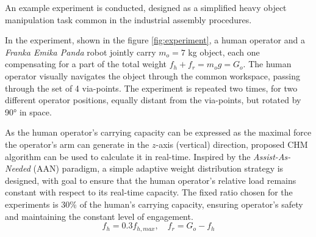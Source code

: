 An example experiment is conducted, designed as a simplified heavy object manipulation task common in the industrial assembly procedures. 

In the experiment, shown in the figure \ref{fig:experiment}, a human operator and a \textit{Franka Emika Panda} robot jointly carry $m_o\!=\!7$ kg object, each one compensating for a part of the total weight {$ f_h\! +\! f_r\! =\! m_og\! =\! G_o $}. The human operator {visually} navigates the object through the common workspace, passing through {the set of} 4 via-points. 
{The experiment is repeated two times, 
for two different operator positions, equally distant from the via-points, but rotated by 90° in space.}



{As the human operator's carrying capacity can be expressed as the maximal force the operator's arm can generate in the $z$-axis (vertical) direction, proposed CHM algorithm can be used to calculate it in real-time.}
{ Inspired by} the \textit{Assist-As-Needed} (AAN)\cite{carmichael2013admittance} paradigm, {a simple adaptive weight distribution strategy is designed, with goal to ensure} that the human operator's relative load remains constant with respect to its real-time capacity. The fixed ratio chosen for the experiments is 30\% of the human's carrying capacity, {ensuring operator's safety and maintaining the constant level of engagement}.
$$
f_h = 0.3 f_{h,max}, \quad f_r = G_o - f_h
$$


